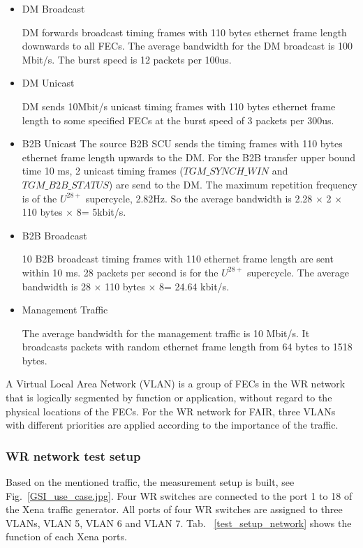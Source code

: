 \begin{itemize}
    \item DM Broadcast 

DM forwards broadcast timing frames with 110 bytes ethernet frame length downwards to all FECs. The average bandwidth for the DM broadcast is 100 Mbit/s. The burst speed is 12 packets per 100us.
 		\item DM Unicast 

DM sends 10Mbit/s unicast timing frames with 110 bytes ethernet frame length to some specified FECs at the burst speed of 3 packets per 300us.
	\item B2B Unicast
The source B2B SCU sends the timing frames with 110 bytes ethernet frame length upwards to the DM. For the B2B transfer upper bound time 10 ms, 2 unicast timing frames ($TGM\_ SYNCH\_WIN$ and $TGM\_ B2B\_ STATUS$) are send to the DM. The maximum repetition frequency is of the $U^{28+}$ supercycle, 2.82Hz. So the average bandwidth is 2.28 $\times$ 2 $\times$ 110 bytes $\times$ 8= 5kbit/s. 
	\item B2B Broadcast

10 B2B broadcast timing frames with 110 ethernet frame length are sent within 10 ms. 28 packets per second is for the $U^{28+}$ supercycle. The average bandwidth is 28 $\times$ 110 bytes $\times$ 8= 24.64 kbit/s.
	\item Management Traffic

The average bandwidth for the management traffic is 10 Mbit/s. It broadcasts packets with random ethernet frame length from 64 bytes to 1518 bytes. 
\end{itemize}

A Virtual Local Area Network (VLAN) is a group of FECs in the WR network that is logically segmented by function or application, without regard to the physical locations of the FECs. For the WR network for FAIR, three VLANs with different priorities are applied according to the importance of the traffic. 

\subsubsection{WR network test setup}
Based on the mentioned traffic, the measurement setup is built, see Fig.~\ref{GSI_use_case.jpg}. Four WR switches are connected to the port 1 to 18 of the Xena traffic generator. All ports of four WR switches are assigned to three VLANs, VLAN 5, VLAN 6 and VLAN 7. Tab. ~\ref{test_setup_network} shows the function of each Xena ports.

